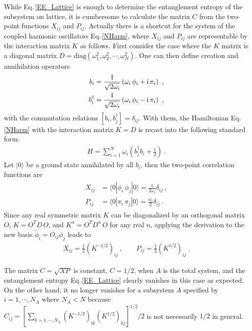 While Eq.\,\eqref{EE_Lattice} is enough to determine the entanglement entropy of the subsystem on lattice, it is cumbersome to calculate the matrix $C$ from the two-point functions $X_{ij}$ and $P_{ij}$.
Actually there is a shortcut for the system of the coupled harmonic oscillators Eq.\,\eqref{NHarm}, where $X_{ij}$ and $P_{ij}$ are representable by the interaction matrix $K$ as follows.
First consider the case where the $K$ matrix is a diagonal matrix $D = \text{diag}(\omega_1^2, \omega_2^2, \cdots,\omega_N^2)$.
One can then define creation and annihilation operators 
	\begin{align}
		\begin{aligned}
			b_i &= \frac{1}{\sqrt{2\omega_i}} \left(\omega_i\, \phi_i + \mathrm{i}\, \pi_i\right) \ , \\
			b_i^\dagger &= \frac{1}{\sqrt{2\omega_i}} \left(\omega_i\, \phi_i  - \mathrm{i}\,\pi_i\right) \ ,
		\end{aligned}
	\end{align}
with the commutation relations $[b_i, b_j^\dagger] = \delta_{ij}$.
With them, the Hamiltonian Eq.\,\eqref{NHarm} with the interaction matrix $K=D$ is recast into the following standard form:
\begin{align}
	H = \sum_{i=1}^N \omega_i \left( b_i^\dagger b_i + \frac{1}{2}\right) \ .
\end{align}
Let $|0\rangle$ be a ground state annihilated by all $b_i$, then the two-point correlation functions are
	\begin{align}\label{XandP}
	\begin{aligned}
		X_{ij} &= \langle 0| \phi_i \,\phi_j |0\rangle = \frac{1}{2\omega_i}\delta_{ij} \ , \\
		P_{ij} &= \langle 0| \pi_i \,\pi_j |0\rangle = \frac{\omega_i}{2}\delta_{ij} \ .
	\end{aligned}
	\end{align}
Since any real symmetric matrix $K$ can be diagonalized by an orthogonal matrix $O$, $K = O^T D\,O$, and $K^n = O^T D^n\,O$ for any real $n$, applying the derivation to the new basis $\tilde\phi_i = O_{ij} \phi_j$ leads to
\begin{align}
X_{ij} = \frac{1}{2}(K^{-1/2})_{ij} \ , \qquad P_{ij} = \frac{1}{2}(K^{1/2})_{ij} \ .
\end{align}

The matrix $C=\sqrt{XP}$ is constant, $C = 1/2$, when $A$ is the total system, and the entanglement entropy Eq.\,\eqref{EE_Lattice} clearly vanishes in this case as expected.
On the other hand, it no longer vanishes for a subsystem $A$ specified by $i=1,\cdots, N_A$ where $N_A < N$ because $C_{ij} = \left[\sum_{k=1,\cdots, N_A} (K^{-1/2})_{ik} (K^{1/2})_{kj}\right]^{1/2}/2$ is not necessarily $1/2$ in general.





